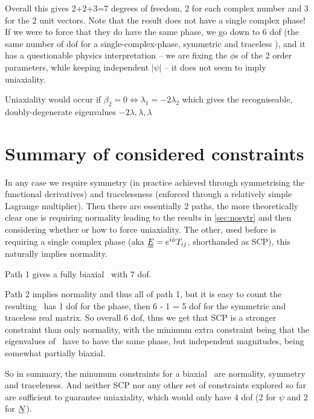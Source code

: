 \documentclass[11pt]{article}
\begin{document}
Overall this gives 2+2+3=7 degrees of freedom, 2 for each complex number and 3 for the 2 unit vectors.
Note that the result does not have a single complex phase!
If we were to force that they do have the same phase, we go down to 6 dof (the same number of dof for a single-complex-phase, symmetric and traceless \EE), and it has a questionable physics interpretation -- we are fixing the $\phi$s of the 2 order parameters, while keeping independent $|\psi|$ -- it does not seem to imply uniaxiality.

Uniaxiality would occur if $\beta_2 = 0 \Leftrightarrow \lambda_1 = -2\lambda_2$ which gives the recogniseable, doubly-degenerate eigenvalues $-2\lambda, \lambda, \lambda$

\section{Summary of considered constraints}
In any case we require symmetry (in practice achieved through symmetrising the functional derivatives) and tracelessness (enforced through a relatively simple Lagrange multiplier).
Then there are essentially 2 paths, the more theoretically clear one is requiring normality leading to the results in \cref{sec:nosytr} and then considering whether or how to force uniaxiality.
The other, used before is requiring a single complex phase (aka $\du{E} = e^{i\phi}T_{ij}$, shorthanded as SCP), this naturally implies normality.

Path 1 gives a fully biaxial \EE\ with 7 dof.

Path 2 implies normality and thus all of path 1, but it is easy to count the resulting \EE\ has 1 dof for the phase, then 6 - 1 = 5 dof for the symmetric and traceless real matrix.
So overall 6 dof, thus we get that SCP is a stronger constraint than only normality, with the minimum extra constraint being that the eigenvalues of \EE\ have to have the same phase, but independent magnitudes, being somewhat partially biaxial.

So in summary, the minumum constraints for a biaxial \EE\ are normality, symmetry and traceleness. And neither SCP nor any other set of constraints explored so far are sufficient to guarantee uniaxiality, which would only have 4 dof (2 for $\psi$ and 2 for $\su{N}$).
\end{document}
